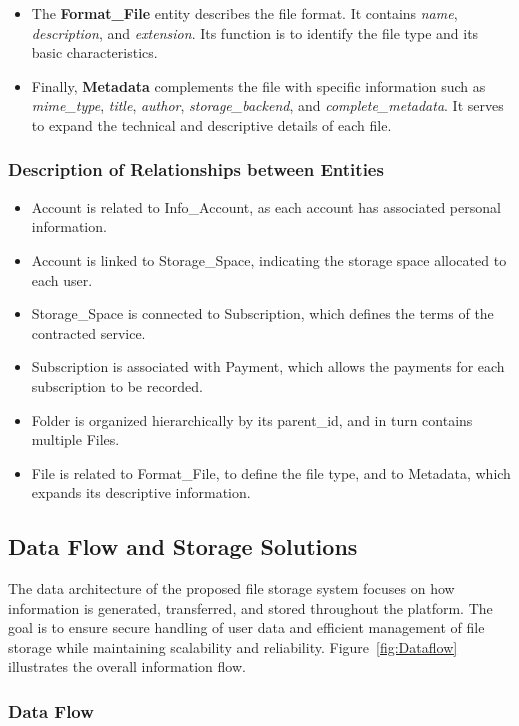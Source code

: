 \begin{itemize}
    \item The \textbf{Format\_File} entity describes the file format. It contains \textit{name}, \textit{description}, and \textit{extension}. Its function is to identify the file type and its basic characteristics.

    \item Finally, \textbf{Metadata} complements the file with specific information such as \textit{mime\_type}, \textit{title}, \textit{author}, \textit{storage\_backend}, and \textit{complete\_metadata}. It serves to expand the technical and descriptive details of each file.
\end{itemize}
\subsubsection{Description of Relationships between Entities}
\begin{itemize}
    \item Account is related to Info\_Account, as each account has associated personal information.
    \item Account is linked to Storage\_Space, indicating the storage space allocated to each user.
    \item Storage\_Space is connected to Subscription, which defines the terms of the contracted service.
    \item Subscription is associated with Payment, which allows the payments for each subscription to be recorded.
    \item Folder is organized hierarchically by its parent\_id, and in turn contains multiple Files.
    \item File is related to Format\_File, to define the file type, and to Metadata, which expands its descriptive information.
\end{itemize}
\subsection{Data Flow and Storage Solutions}

The data architecture of the proposed file storage system focuses on how information is generated, transferred, and stored throughout the platform. The goal is to ensure secure handling of user data and efficient management of file storage while maintaining scalability and reliability. Figure~\ref{fig:Dataflow} illustrates the overall information flow.

\subsubsection{Data Flow}

